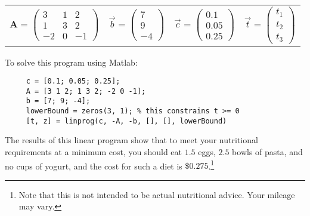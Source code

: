 \documentclass[12pt,letterpaper]{article}
\begin{document}
\begin{tabular}{cccc}
${\mathbf A} = \left ( \begin{array}{ccc}3 & 1 & 2\\1 & 3 & 2\\-2 & 0 & -1 \end{array} \right ) $
&
$\vec{b} = \left ( \begin{array}{c}7\\9\\-4\end{array} \right ) $
&
$\vec{c} = \left ( \begin{array}{c}0.1\\0.05\\0.25\end{array} \right ) $
&
$\vec{t} = \left ( \begin{array}{c}t_1\\t_2\\t_3\end{array} \right ) $
\end{tabular}

\vspace{3mm} 

To solve this program using Matlab:
\begin{verbatim}
     c = [0.1; 0.05; 0.25];
     A = [3 1 2; 1 3 2; -2 0 -1];
     b = [7; 9; -4];
     lowerBound = zeros(3, 1); % this constrains t >= 0
     [t, z] = linprog(c, -A, -b, [], [], lowerBound)
\end{verbatim}

The results of this linear program show that to meet your nutritional requirements at a minimum cost, you should eat $1.5$ eggs, $2.5$ bowls of pasta, and no cups of yogurt, and the cost for such a diet is $\$0.275$.\footnote{Note that this is not intended to be actual nutritional advice.  Your mileage may vary.}
\end{document}
